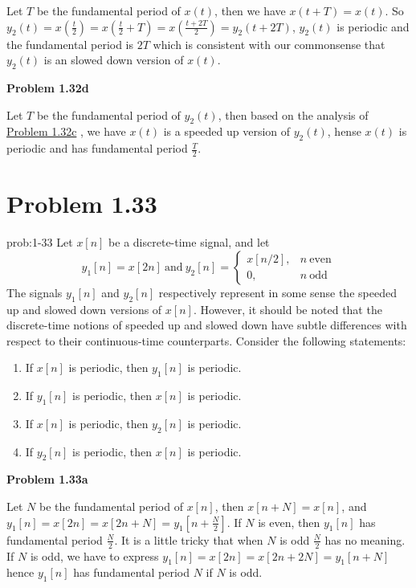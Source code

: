 \documentclass[koma,a4paper,utopia,12pt,listings-color,microtype,paralist,colorlinks,urlcolor=red]{org-article}
\begin{document}
Let \(T\) be the fundamental period of \(x(t)\), then we have \(x(t+T) = x(t)\).
So \(y_{2}(t) = x(\tfrac{t}{2}) = x(\tfrac{t}{2} + T) = x(\frac{t+ 2T}{2})=
y_{2}(t+2T)\), \(y_{2}(t)\) is periodic and the fundamental period is
\(2T\) which is consistent with our commonsense that \(y_{2}(t)\) is an
slowed down version of \(x(t)\).

\textbf{Problem 1.32d}

Let \(T\) be the fundamental period of \(y_{2}(t)\), then based on the analysis
of \hyperref[Problem 1.32c]{Problem 1.32c} , we have \(x(t)\) is a speeded up version of \(y_{2}(t)\),
hense \(x(t)\) is periodic and has fundamental period \(\frac{T}{2}\).
\section{Problem 1.33}
\label{sec:orgf7b6502}


\begin{prob}[]{prob:1-33}
Let \(x[n]\) be a discrete-time signal, and let
\begin{equation*}
y_{1}[n] = x[2n] \ \mathrm{and}\ y_{2}[n] =
\begin{cases}
x[n/2], & n\ \mathrm{even} \\
0, & n\ \mathrm{odd}
\end{cases}
\end{equation*}
The signals \(y_{1}[n]\) and \(y_{2}[n]\) respectively represent in some
sense the speeded  up and slowed down versions of \(x[n]\). However, it
should be noted that the discrete-time notions of speeded up and slowed down
have subtle differences with respect to their continuous-time counterparts.
Consider the following statements:

\begin{enumerate}
\item If \(x[n]\) is periodic, then \(y_{1}[n]\) is periodic.
\item If \(y_{1}[n]\) is periodic, then \(x[n]\) is periodic.
\item If \(x[n]\) is periodic, then \(y_{2}[n]\) is periodic.
\item If \(y_{2}[n]\) is periodic, then \(x[n]\) is periodic.
\end{enumerate}
\label{prob:1-33}
\end{prob}

\textbf{Problem 1.33a}

Let \(N\) be the fundamental period of \(x[n]\), then \(x[n+N] = x[n]\), and
\(y_{1}[n] = x[2n] = x[2n+N] = y_{1}[n+ \frac{N}{2}]\). If \(N\) is even, then
\(y_{1}[n]\) has fundamental period \(\frac{N}{2}\).  It is a little tricky
that when \(N\) is odd \(\frac{N}{2}\) has no meaning. If \(N\) is odd, we have
to express \(y_{1}[n] = x[2n] = x[2n+2N] = y_{1}[n+ N]\) hence \(y_{1}[n]\) has
fundamental period \(N\) if \(N\) is odd.
\end{document}
